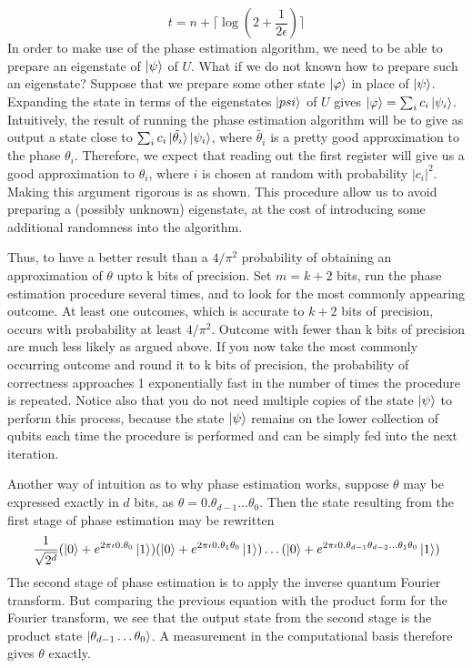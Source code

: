 \[
t=n + \lceil \log\left(2+\frac{1}{2\epsilon}\right)\rceil
\]
In order to make use of the phase estimation algorithm, we need to be able to prepare an eigenstate of $\ket{\psi}$ of $U$. What if we do not known how to prepare such an eigenstate? Suppose that we prepare some other state $\ket{\varphi}$ in place of $\ket{\psi}$. Expanding the state in terms of the eigenstates $\ket{psi}$ of $U$ gives $\ket{\varphi}=\sum_i c_i\ket{\psi_i}$. Intuitively, the result of running the phase estimation algorithm will be to give as output a state close to $\sum_ic_i\ket{\tilde{\theta_i}}\ket{\psi_i}$, where $\tilde{\theta_i}$ is a pretty good approximation to the phase $\theta_i$. Therefore, we expect that reading out the first register will give us a good approximation to $\theta_i$, where $i$ is chosen at random with probability $|c_i|^2$. Making this argument rigorous is as shown. This procedure allow us to avoid preparing a (possibly unknown) eigenstate, at the cost of introducing some additional randomness into the algorithm.

Thus, to have a better result than a $4/\pi^2$ probability of obtaining an approximation of $\theta$ upto k bits of precision.
Set $m=k+2$ bits, run the phase estimation procedure several times, and to look for the most commonly appearing outcome. At least one outcomes, which is accurate to $k+2$ bits of precision, occurs with probability at least $4/\pi^2$. Outcome with fewer than k bits of precision are much less likely as argued above.
If you now take the most commonly occurring outcome and round it to k bits of precision, the probability of correctness approaches 1 exponentially fast in the number of times the procedure is repeated. Notice also that you do not need multiple copies of the state $\ket{\psi}$ to perform this process, because the state $\ket{\psi}$ remains on the lower collection of qubits each time the procedure is performed
and can be simply fed into the next iteration.

Another way of intuition as to why phase estimation works, suppose $\theta$ may be expressed exactly in $d$ bits, as $\theta = 0.\theta_{d-1}\ldots\theta_0$. Then the state resulting from the first stage of phase estimation may be rewritten
\[
\frac{1}{\sqrt{2^d}}(\ket{0}+e^{2\pi\iota0.\theta_0}\ket{1})(\ket{0}+e^{2\pi\iota 0.\theta_1\theta_0}\ket{1})\ldots(\ket{0}+e^{2\pi\iota0.\theta_{d-1}\theta_{d-2}\ldots\theta_1\theta_0}\ket{1})
\]
The second stage of phase estimation is to apply the inverse quantum Fourier transform. But comparing the previous equation with the product form for the Fourier transform, we see that the output state from the second stage is the product state $\ket{\theta_{d-1} \ldots\theta_0}$. A measurement in the computational basis therefore gives $\theta$ exactly.

